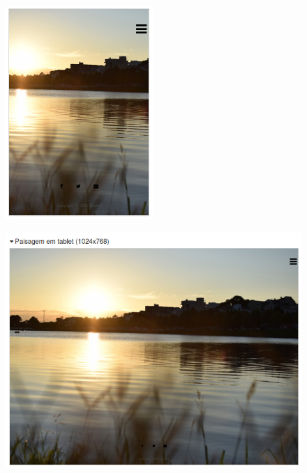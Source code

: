 \begin{figure}[!htb]
\centering
\begin{minipage}{.5\textwidth}
  \centering
  \includegraphics[width=.3\linewidth]{./img/1.png}
  \label{fig:test1}
\end{minipage}%
\begin{minipage}{.5\textwidth}
  \centering
  \includegraphics[width=.8\linewidth]{./img/6.png}
  \label{fig:test2}
\end{minipage}
\end{figure}
